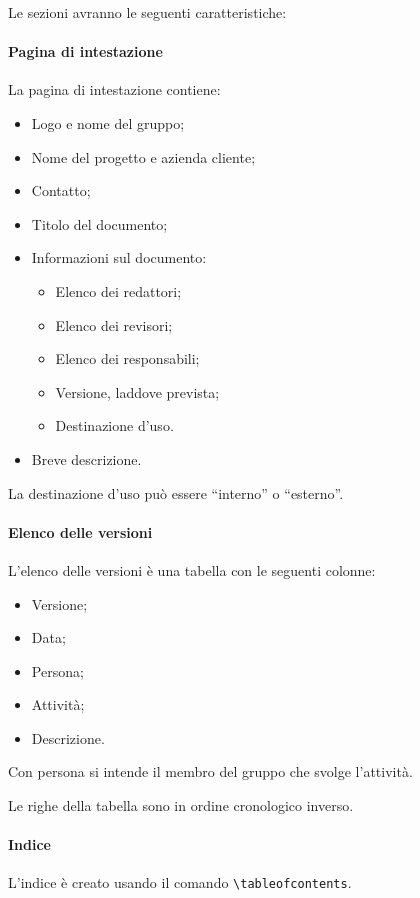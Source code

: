 \documentclass[a4paper, 12pt]{article}
\begin{document}
Le sezioni avranno le seguenti caratteristiche:

\paragraph{Pagina di intestazione}
La pagina di intestazione contiene:
\begin{itemize}
\item Logo e nome del gruppo;
\item Nome del progetto e azienda cliente;
\item Contatto;
\item Titolo del documento;
\item Informazioni sul documento:
\begin{itemize}
	\item Elenco dei redattori;
	\item Elenco dei revisori;
	\item Elenco dei responsabili;
	\item Versione, laddove prevista;
	\item Destinazione d'uso.
\end{itemize}
\item Breve descrizione.
\end{itemize}

La destinazione d'uso può essere ``interno'' o ``esterno''.



\paragraph{Elenco delle versioni}
L'elenco delle versioni è una tabella con le seguenti colonne:
\begin{itemize}
\item Versione;
\item Data;
\item Persona;
\item Attività;
\item Descrizione.
\end{itemize}

Con persona si intende il membro del gruppo che svolge l'attività.

Le righe della tabella sono in ordine cronologico inverso.

\paragraph{Indice}
L'indice è creato usando il comando \verb-\tableofcontents-.
\end{document}
